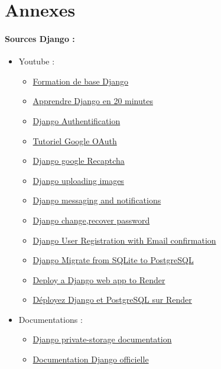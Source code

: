 \documentclass[12pt]{article} %
\begin{document}
\newpage
\section*{Annexes}
\paragraph{Sources Django :} 
\begin{itemize}
\item Youtube :
	\begin{itemize}
	\item \href{https://www.youtube.com/watch?v=Bn0k9DDYBZM&t=7170s}{Formation de base Django}
	\item \href{https://www.youtube.com/watch?v=KRRbxIsQ8mo}{Apprendre Django en 20 minutes}
	\item \href{https://www.youtube.com/watch?v=ZpiokBHjPtA&list=PLrSOXFDHBtfED_VFTa6labxAOPh29RYiO&index=13}{Django Authentification}
	\item \href{https://www.youtube.com/watch?v=Gk9tsLHMMsM&t=823s}{Tutoriel Google OAuth}
	\item \href{https://www.youtube.com/watch?v=06gywnBUZ8g}{Django google Recaptcha}
	\item \href{https://www.youtube.com/watch?v=JQ5MR-09msw}{Django uploading images}
	\item \href{https://www.youtube.com/watch?v=77KQvhNtVv4&t=396s}{Django messaging and notifications}
	\item \href{https://www.youtube.com/watch?v=m718d9tgnZU&t=1331s}{Django change,recover password}
	\item \href{https://www.youtube.com/watch?v=wB1qOExDsYY&t=607s}{Django User Registration with Email confirmation}
	\item \href{https://www.youtube.com/watch?v=8qEB-19t8Lw&t=278s}{Django Migrate from SQLite to PostgreSQL}
	\item \href{https://www.youtube.com/watch?v=AgTr5mw4zdI&t=1s}{Deploy a Django web app to Render}
	\item \href{https://www.youtube.com/watch?v=pthIHQ0IuNM}{Déployez Django et PostgreSQL sur Render}	
	\end{itemize}
\item Documentations :
	\begin{itemize}
	\item \href{https://pypi.org/project/django-private-storage/}{Django private-storage documentation}
	\item \href{https://docs.djangoproject.com/en/5.1/}{Documentation Django officielle}


\end{itemize} 
	
\end{itemize}
\end{document}
